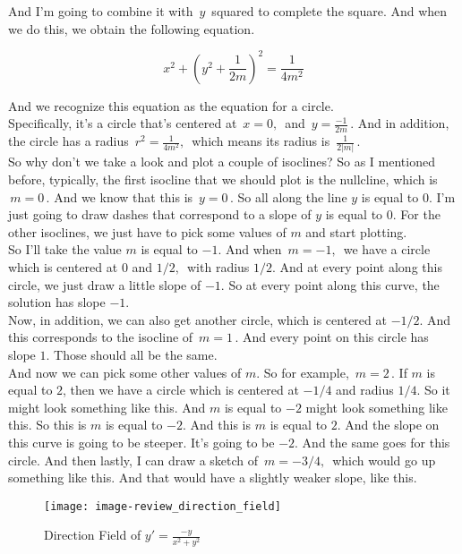 \begin{enumerate}
  And I'm going to combine it with $\,y \,$ squared to complete the square.
  And when we do this, we obtain the following equation.

  \begin{equation*}
    x^2 + (y^2 + \frac{1}{2m})^2 = \frac{1}{4m^2}
  \end{equation*}
  
  And we recognize this equation as the equation for a circle.\\
  Specifically, it's a circle that's
  centered at $\, x = 0, \, $ and $\, y = \frac{-1}{2m}\, $.
  And in addition, the circle has a radius
  $\, r^2  = \frac{1}{4m^2},\, $ which  means its radius is
  $\, \frac{1}{2 |m|}\, $.\\
  
  So why don't we take a look and plot a couple of isoclines?
  So as I mentioned before, typically, the first isocline   that we should plot is the nullcline,
  which is $\, m = 0\, $.
  And we know that this is $\, y = 0 \, $.
  So all along the line $y$ is equal to $0$.
  I'm just going to draw dashes that correspond to a slope of $y$ is equal to $0$.
  For the other isoclines, we just have to pick some values of $m$ and start plotting.\\
  So I'll take the value $m$ is equal to $-1$.
  And when $\, m  = -1,\, $ we have a circle which is centered at $0$ and $1/2,\,$
  with radius $1/2$.
  And at every point along this circle,
  we just draw a little slope of $-1$. So at every point along this curve,
  the solution has slope $-1$.\\
  Now, in addition, we can also get another circle, which
  is centered at $- 1/2$.
  And this corresponds to the isocline of $\, m = 1\,$. 
  And every point on this circle has slope $1$.
  Those should all be the same.\\
  And now we can pick some other values of $m$.
  So for example, $\, m = 2\, $.
  If $m$ is equal to $2$, then we have a circle
  which is centered at $- 1/4$ and radius $1/4$.
  So it might look something like this.
  And $m$ is equal to $-2$ might look something like this.
  So this is $m$ is equal to $- 2$.
  And this is $m$ is equal to $2$.
  And the slope on this curve is going to be steeper.
  It's going to be $-2$.
  And the same goes for this circle.
  And then lastly, I can draw a sketch of $\, m = -3/4 ,\,$ which would go up something like this.
  And that would have a slightly weaker slope, like this.

  \begin{figure}[ht!]
    \centering
    \texttt{[image: image-review\_direction\_field]}
    \caption{Direction Field of $y' = \frac{-y}{x^2 + y^2}$}
  \end{figure}


\end{enumerate}
